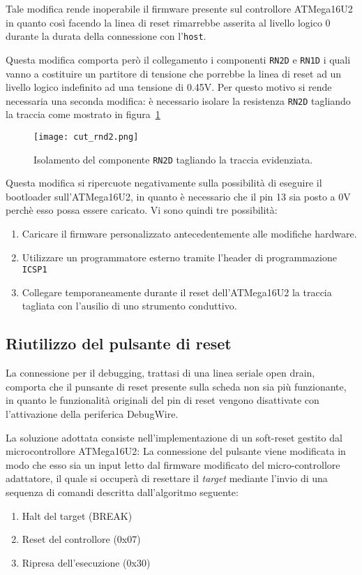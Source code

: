 Tale modifica rende inoperabile il firmware presente sul controllore ATMega16U2 in quanto così facendo la linea di reset rimarrebbe asserita al livello logico 0 durante la durata della connessione con l'\texttt{host}.

Questa modifica comporta però il collegamento i componenti \texttt{RN2D} e \texttt{RN1D} i quali vanno a costituire un partitore di tensione che porrebbe la linea di reset ad un livello logico indefinito ad una tensione di 0.45V. Per questo motivo si rende necessaria una seconda modifica: è necessario isolare la resistenza \texttt{RN2D} tagliando la traccia come mostrato in figura~\ref{fig:cut-rnd2}

\begin{figure}[b]
    \centering
    \texttt{[image: cut\_rnd2.png]}
    \caption[]{Isolamento del componente \texttt{RN2D} tagliando la traccia evidenziata.}\label{fig:cut-rnd2}
\end{figure}

Questa modifica si ripercuote negativamente sulla possibilità di eseguire il bootloader sull'ATMega16U2, in quanto è necessario che il pin 13 sia posto a 0V perchè esso possa essere caricato. Vi sono quindi tre possibilità:
\begin{enumerate}
    \item Caricare il firmware personalizzato antecedentemente alle modifiche hardware.
    \item Utilizzare un programmatore esterno tramite l'header di programmazione \texttt{ICSP1}
    \item Collegare temporaneamente durante il reset dell'ATMega16U2 la traccia tagliata con l'ausilio di uno strumento conduttivo.
\end{enumerate} 

\subsection{Riutilizzo del pulsante di reset}

La connessione per il debugging, trattasi di una linea seriale open drain, comporta che il punsante di reset presente sulla scheda non sia più funzionante, in quanto le funzionalità originali del pin di reset vengono disattivate con l'attivazione della periferica DebugWire.

La soluzione adottata consiste nell'implementazione di un soft-reset gestito dal microcontrollore ATMega16U2: La connessione del pulsante viene modificata in modo che esso sia un input letto dal firmware modificato del micro-controllore adattatore, il quale si occuperà di resettare il \textit{target} mediante l'invio di una sequenza di comandi descritta dall'algoritmo seguente:
\begin{enumerate}
    \item Halt del target (BREAK)
    \item Reset del controllore (0x07)
    \item Ripresa dell'esecuzione (0x30)
\end{enumerate}


